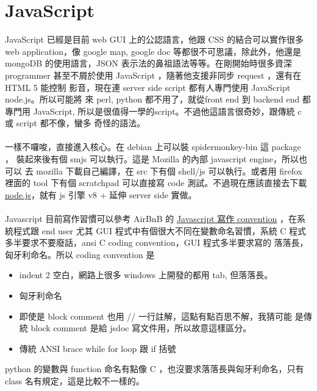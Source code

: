 \chapter{JavaScript}
JavaScript 已經是目前 web GUI 上的公認語言，他跟 CSS 的結合可以實作很多 web
application，像 google map, google doc 等都很不可思議，除此外，他還是
mongoDB 的使用語言，JSON 表示法的鼻祖語法等等。在剛開始時很多資深 programmer
甚至不屑於使用 JavaScript ，隨著他支援非同步 request ，還有在 HTML 5 能控制
影音，現在連 server side script 都有人專門使用 JavaScript node.js。所以可能將
來 perl, python 都不用了，就從front end 到 backend end 都專門用 JavaScript, 
所以是很值得一學的script。不過他這語言很奇妙，跟傳統 c 或 script 都不像，蠻多
奇怪的語法。
\\\\
一樣不囉唆，直接進入核心。在 debian 上可以裝 spidermonkey-bin 這 package ，
裝起來後有個 smjs 可以執行。這是 Mozilla 的內部 javascript engine，所以也可以
去 mozilla 下載自己編譯，在 src 下有個 shell/js 可以執行。或者用 firefox 裡面的
tool 下有個 scratchpad 可以直接寫 code 測試。不過現在應該直接去下載
\href{https://nodejs.org/en}{node.js}，就有 js 引擎 v8 + 延伸 server side 實做。
\\\\
Javascript 目前寫作習慣可以參考 AirBnB 的
\href{https://github.com/airbnb/javascript}{Javascript 寫作 convention}
，在系統程式跟 end user 尤其 GUI 程式中有個很大不同在變數命名習慣，系統
C 程式多半要求不要廢話，ansi C coding convention，GUI 程式多半要求寫的
落落長，匈牙利命名。所以 coding convention 是
\begin{itemize}
  \item indent 2 空白，網路上很多 windows 上開發的都用 tab, 但落落長。
  \item 匈牙利命名
  \item 即使是 block comment 也用 // 一行註解，這點有點百思不解，我猜可能
    是傳統 block comment 是給 jsdoc 寫文件用，所以故意這樣區分。
  \item 傳統 ANSI brace while for loop 跟 if 括號
\end{itemize}
python 的變數與 function 命名有點像 C ，也沒要求落落長與匈牙利命名，只有
class 名有規定，這是比較不一樣的。
